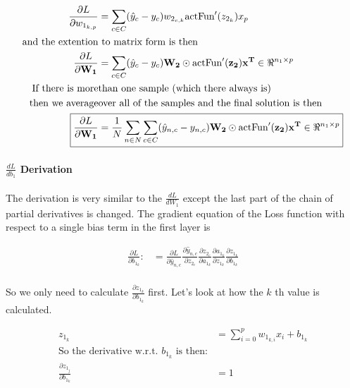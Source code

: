 \documentclass[]{article}
\begin{document}
\begin{align*}
\frac{\partial L}{\partial w_{1_{k,p}}} &= \sum_{c\in C}( \hat{y}_c - y_c) w_{2_{c,k}}\text{actFun}'(z_{2_k})x_p \\
\text{and the extention}&\text{ to matrix form is then} \\
\frac{\partial L}{\partial \mathbf{W_1}} &= \sum_{c\in C}( \hat{y}_c - y_c) \mathbf{W_2}  \odot \text{actFun}'(\mathbf{z_2})\mathbf{x^T} \in \Re^{n_1 \times p} \\
\text{If there is more}&\text{than one sample (which there always is)}\\
\text{then we average}&\text{over all of the samples and the final solution is then} \\
\Aboxed{\frac{\partial L}{\partial \mathbf{W_1}} &=  \frac{1}{N} \sum_{n\in N} \sum_{c\in C}( \hat{y}_{n,c} - y_{n,c}) \mathbf{W_2}  \odot \text{actFun}'(\mathbf{z_2})\mathbf{x^T} \in \Re^{n_1 \times p}} \\
\end{align*}

\paragraph{$\frac{dL}{db_1}$ Derivation}
The derivation is very similar to the $\frac{dL}{dW_1}$ except the last part of the chain of partial derivatives is changed. The gradient equation of the Loss function with respect to a single bias term in the first layer is 

\begin{align*}
\frac{\partial L}{\partial b_{1_{k}}} : &=  \frac{\partial L }{\partial  \hat{y}_{n,c} } \frac{\partial  \hat{y}_{n,c} }{\partial z_{2_c}} \frac{\partial z_{2_c}}{\partial a_{1_k}}\frac{\partial a_{1_k}}{\partial z_{1_k}} \frac{\partial z_{1_k}}{\partial b_{1_{k}}}  \\
\end{align*}

So we only need to calculate $\frac{\partial z_{1_k}} {\partial b_{1_{k}} }$ first. Let's look at how the $k$ th value is calculated. 

\begin{align*}
z_{1_k} &= \sum_{i = 0}^p w_{1_{k,i}}x_i + b_{1_k} \\
\text{So the derivative w.r.t. $b_{1_{k}}$ is then:}\\
\frac{\partial z_{1_j} }{\partial b_{1_{k}}} &= 1 \\
\end{align*}
\end{document}
